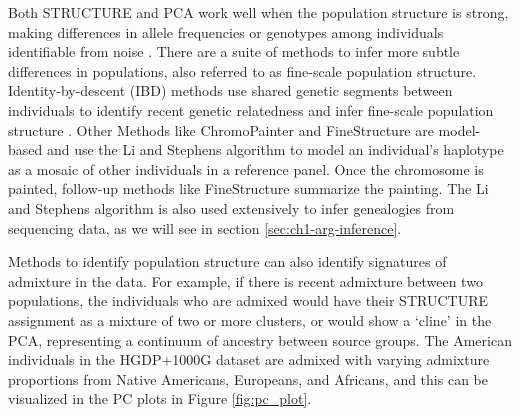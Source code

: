 Both STRUCTURE and PCA work well when the population structure is strong, making differences in allele frequencies or genotypes among individuals identifiable from noise \cite{Patterson2006}. There are a suite of methods to infer more subtle differences in populations, also referred to as fine-scale population structure. Identity-by-descent (IBD) methods use shared genetic segments between individuals to identify recent genetic relatedness and infer fine-scale population structure \cite{nait2020identity}. Other Methods like ChromoPainter and FineStructure \cite{Lawson2012} are model-based and use the Li and Stephens \cite{Li2003} algorithm to model an individual's haplotype as a mosaic of other individuals in a reference panel. Once the chromosome is painted, follow-up methods like FineStructure summarize the painting. The Li and Stephens algorithm is also used extensively to infer genealogies from sequencing data, as we will see in section \ref{sec:ch1-arg-inference}.

Methods to identify population structure can also identify signatures of admixture in the data. For example, if there is recent admixture between two populations, the individuals who are admixed would have their STRUCTURE assignment as a mixture of two or more clusters, or would show a `cline' in the PCA, representing a continuum of ancestry between source groups. The American individuals in the HGDP+1000G dataset are admixed with varying admixture proportions from Native Americans, Europeans, and Africans, and this can be visualized in the PC plots in Figure \ref{fig:pc_plot}.

